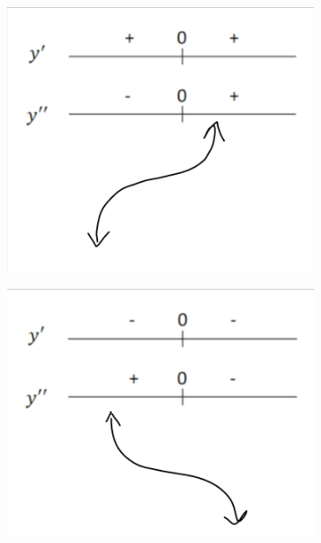 \documentclass{article}
\begin{document}
\begin{figure}[ht]
    \begin{subfigure}[b]{0.45\textwidth}
        \centering
        \includegraphics[width=\linewidth]{imgs/diagram_3.png}
        \caption{}
    \end{subfigure}
    \hfill
    \begin{subfigure}[b]{0.45\textwidth}
        \centering
        \includegraphics[width=\linewidth]{imgs/diagram_4.png}
        \caption{}
    \end{subfigure}
    

\end{figure}
\end{document}

